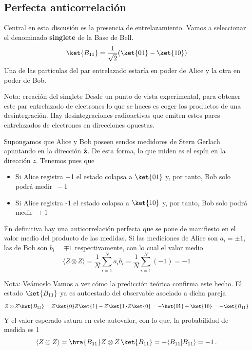 \documentclass[a4paper,11pt]{book} %
\numberwithin{equation}{chapter}
\newcommand{\braket}[2]{\langle #1|#2\rangle}
\begin{document}
    
        \subsection{Perfecta anticorrelación}

Central en esta discusión es la presencia de entrelazamiento. Vamos a seleccionar el denominado \textbf{singlete} de la Base de Bell. 
	\begin{equation}
	\ket{B_{11}}=\frac{1}{\sqrt{2}}(\ket{01}-\ket{10})
	\end{equation}
Una de las partículas del par entrelazado estaría en poder de Alice y la otra en poder de Bob. 

	\begin{mybox_blue}{Nota: creación del singlete}
	Desde un punto de vista experimental, para obtener este par entrelazado de electrones lo que se haces es coger los productos
	de una desintegración. Hay desintegraciones radioactivas que emiten estos pares entrelazados de electrones en direcciones 
	opuestas. 	
	\end{mybox_blue}

Supongamos que  Alice y Bob poseen sendos medidores de Stern Gerlach apuntando en la dirección $\hat{\bf z}$. De esta forma, lo que miden es el espín en la dirección $z$. Tenemos pues que
	\begin{itemize}
		\item Si Alice registra +1 el estado colapsa a $\ket{01}$ y, por tanto, Bob solo podrá medir  $\, -1$
		\item Si Alice registra -1 el estado colapsa a $\ket{10}$ y, por tanto, Bob solo podrá medir  $\, +1$
	\end{itemize}
En definitiva hay una anticorrelación perfecta que se pone de manifiesto en el valor medio del producto de las medidas. Si las mediciones de Alice son $a_i=\pm 1$, las de Bob son $b_i=\mp 1$ respectivamente, con lo cual el valor medio
\begin{equation}
\langle Z\otimes Z\rangle = \frac{1}{N}\sum_{i=1}^N a_i b_i =\frac{1}{N}\sum_{i=1}^N (-1) = -1
\end{equation}

	\begin{mybox_blue}{Nota: Veámoslo}
	Vamos a ver cómo la predicción teórica confirma este hecho. El estado $\ket{B_{11}}$ ya es autoestado 
	del observable asociado a dicha pareja
	\begin{equation}
	Z\otimes Z \ket{B_{11}} = Z\ket{0}Z\ket{1} - Z\ket{1}Z\ket{0} = -\ket{01} + \ket{10} = -\ket{B_{11}}
	\end{equation}
	Y el valor esperado satura en este autovalor, con lo que, la probabilidad de medida es 1
	\begin{equation}
	\langle Z\otimes Z\rangle = \bra{B_{11}}Z\otimes Z\,  \ket{B_{11}}  = -\braket{B_{11}}{B_{11}}= -1\, .
	\end{equation}
	\end{mybox_blue}
\end{document}
